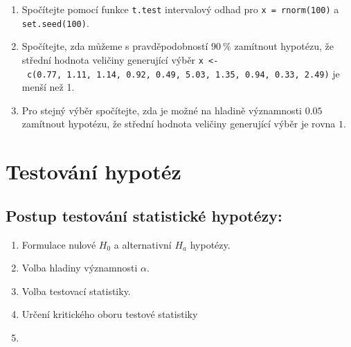 \documentclass[
  letterpaper,
  DIV=11,
  numbers=noendperiod]{scrreprt}
\providecommand{\tightlist}{%
  \setlength{\itemsep}{0pt}\setlength{\parskip}{0pt}}\usepackage{longtable,booktabs,array}
\begin{document}
\begin{tcolorbox}[enhanced jigsaw, toprule=.15mm, breakable, title=\textcolor{quarto-callout-tip-color}{\faLightbulb}\hspace{0.5em}{Cvičení}, colframe=quarto-callout-tip-color-frame, bottomrule=.15mm, left=2mm, leftrule=.75mm, colbacktitle=quarto-callout-tip-color!10!white, colback=white, bottomtitle=1mm, toptitle=1mm, opacityback=0, opacitybacktitle=0.6, arc=.35mm, coltitle=black, rightrule=.15mm, titlerule=0mm]

\begin{enumerate}
\def\labelenumi{\arabic{enumi}.}
\tightlist
\item
  Spočítejte pomocí funkce \texttt{t.test} intervalový odhad pro
  \texttt{x\ =\ rnorm(100)} a \texttt{set.seed(100)}.\\
\item
  Spočítejte, zda můžeme s pravděpodobností \(90\:\%\) zamítnout
  hypotézu, že střední hodnota veličiny generující výběr
  \texttt{x\ \textless{}-\ c(0.77,\ 1.11,\ 1.14,\ 0.92,\ 0.49,\ 5.03,\ 1.35,\ 0.94,\ 0.33,\ 2.49)}
  je menší než 1.\\
\item
  Pro stejný výběr spočítejte, zda je možné na hladině významnosti
  \(0.05\) zamítnout hypotézu, že střední hodnota veličiny generující
  výběr je rovna \(1\).
\end{enumerate}

\end{tcolorbox}


\hypertarget{testovuxe1nuxed-hypotuxe9z}{%
\chapter{Testování hypotéz}\label{testovuxe1nuxed-hypotuxe9z}}

\hypertarget{postup-testovuxe1nuxed-statistickuxe9-hypotuxe9zy}{%
\section{Postup testování statistické
hypotézy:}\label{postup-testovuxe1nuxed-statistickuxe9-hypotuxe9zy}}

\begin{enumerate}
\def\labelenumi{\arabic{enumi}.}
\tightlist
\item
  Formulace nulové \(H_0\) a alternativní \(H_a\) hypotézy.\\
\item
  Volba hladiny významnosti \(\alpha\).\\
\item
  Volba testovací statistiky.\\
\item
  Určení kritického oboru testové statistiky
\item
\end{enumerate}
\end{document}
